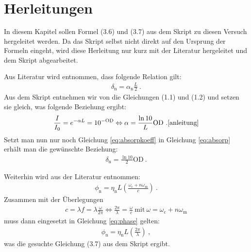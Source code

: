 
\section{Herleitungen}
\label{sec:herleitung}

In diesem Kapitel sollen Formel (3.6) und (3.7) aus dem Skript zu diesen Versuch hergeleitet werden. Da das Skript selbst nicht direkt auf den Ursprung der Formeln eingeht, wird diese Herleitung nur kurz mit der Literatur  hergeleitet und dem Skript abgearbeitet.

Aus Literatur  wird entnommen, dass folgende Relation gilt:
\begin{gather}
    \delta_\mathrm{n} = \alpha_\mathrm{n} \frac{L}{2}~.
    \label{eq:absorp}
\end{gather}
Aus dem Skript entnehmen wir von die Gleichungen (1.1) und (1.2) und setzen sie gleich, was folgende Beziehung ergibt:
\begin{gather}
    \frac{I}{I_0} = e^{-\alpha L} = 10^{-\mathrm{OD}} \Leftrightarrow \alpha = \frac{\ln 10}{L} \mathrm{OD}~. \cite{anleitung}
    \label{eq:absorpkoeff}
\end{gather}
Setzt man nun nur noch Gleichung \ref{eq:absorpkoeff} in Gleichung \ref{eq:absorp} erhält man die gewünschte Beziehung:
\begin{gather}
    \boxed{\delta_\mathrm{n} = \frac{\ln 10}{2} \mathrm{OD}}~.
\end{gather}

Weiterhin wird aus der Literatur  entnommen:
\begin{gather}
    \phi_\mathrm{n} = \eta_\mathrm{n} L \left( \frac{\omega_\mathrm{c} + n \omega_\mathrm{m}}{c} \right)~.
    \label{eq:phase}
\end{gather}
Zusammen mit der Überlegungen
\begin{gather}
    c = \lambda f = \lambda \frac{\omega}{2\pi} \Leftrightarrow \frac{2\pi}{\lambda} = \frac{\omega}{c}~\mathrm{mit}~\omega=\omega_\mathrm{c} + n \omega_\mathrm{m}
\end{gather}
muss dann eingesetzt in Gleichung \ref{eq:phase} gelten:
\begin{gather}
    \boxed{\phi_\mathrm{n} = \eta_\mathrm{n} L \left( \frac{2\pi}{\lambda} \right)}~,
\end{gather}
was die gesuchte Gleichung (3.7) aus dem Skript ergibt.